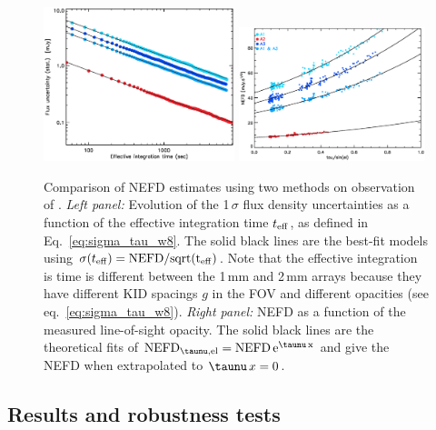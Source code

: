 \begin{figure}[!thbp]
  \begin{center}
    \includegraphics[trim={0.5cm, 0, 0, 0.5cm}, clip, angle=0, width=0.495\textwidth]{Figures/hls_nefd_vst.eps}
    \includegraphics[trim={0.5cm, 0, 0.2cm, 0.5cm}, clip, angle=0, width=0.485\textwidth]{Figures/hls_NEFD_vs_TauElev_all.eps}
    \caption{Comparison of NEFD estimates using two methods on observation of
      \hls. \emph{Left panel:} Evolution of the 1\,$\sigma$ flux density
      uncertainties as a function of the effective integration time
      $t_{\rm{eff}}$, as defined in Eq.~\ref{eq:sigma_tau_w8}. The solid black
      lines are the best-fit models using $\sigma(t_{\rm{eff}}) =
      \rm{NEFD}/sqrt(t_{\rm{eff}})$. Note that the effective integration is time
      is different between the 1\,mm and 2\,mm arrays because they have
      different KID spacings $g$ in the FOV and different opacities (see
      eq.~\ref{eq:sigma_tau_w8}). \emph{Right panel:} NEFD as a function of the
    measured line-of-sight opacity. The solid black lines are the theoretical
    fits of $\rm{NEFD}_{\taunu, el} = \rm{NEFD}\, e^{\taunu\,x}$ and give the
    NEFD when extrapolated to $\taunu\,x = 0$. }
    \label{fig:nefd_twomethods}
  \end{center}
\end{figure}

\subsection{Results and robustness tests}
\label{se:nefd_results}


